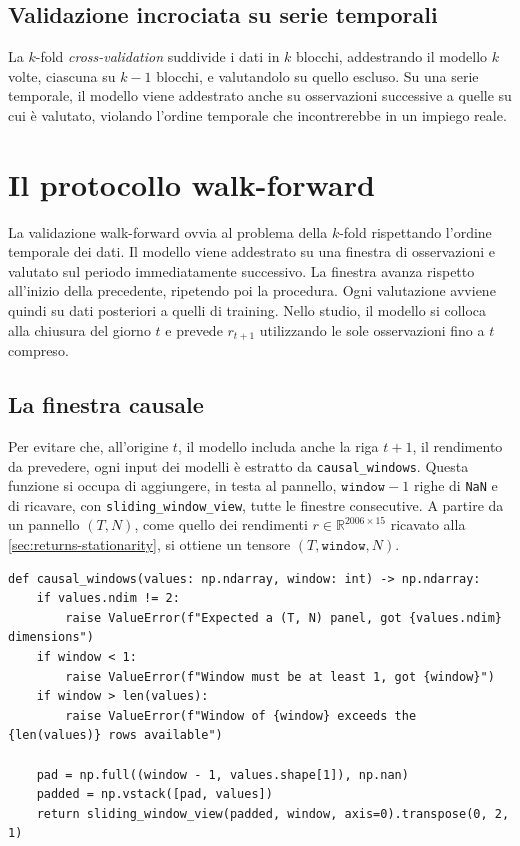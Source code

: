 \subsection{Validazione incrociata su serie temporali}

La $k$-fold \emph{cross-validation} suddivide i dati in $k$ blocchi, addestrando il modello $k$ volte, ciascuna su $k-1$ blocchi, e valutandolo su quello escluso. Su una serie temporale, il modello viene addestrato anche su osservazioni successive a quelle su cui è valutato, violando l'ordine temporale che incontrerebbe in un impiego reale.

\section{Il protocollo walk-forward}
\label{sec:tc-walkforward}

La validazione walk-forward ovvia al problema della $k$-fold rispettando l'ordine temporale dei dati. Il modello viene addestrato su una finestra di osservazioni e valutato sul periodo immediatamente successivo. La finestra avanza rispetto all'inizio della precedente, ripetendo poi la procedura. Ogni valutazione avviene quindi su dati posteriori a quelli di training. Nello studio, il modello si colloca alla chiusura del giorno $t$ e prevede $r_{t+1}$ utilizzando le sole osservazioni fino a $t$ compreso.

\subsection{La finestra causale}

Per evitare che, all'origine $t$, il modello includa anche la riga $t+1$, il rendimento da prevedere, ogni input dei modelli è estratto da \texttt{causal\_windows}. Questa funzione si occupa di aggiungere, in testa al pannello, $\texttt{window}-1$ righe di \texttt{NaN} e di ricavare, con \texttt{sliding\_window\_view}, tutte le finestre consecutive. A partire da un pannello $(T, N)$, come quello dei rendimenti $r\in\mathbb{R}^{2006\times 15}$ ricavato alla \cref{sec:returns-stationarity}, si ottiene un tensore $(T, \texttt{window}, N)$.

\begin{listing}[H]
\begin{verbatim}
def causal_windows(values: np.ndarray, window: int) -> np.ndarray:
    if values.ndim != 2:
        raise ValueError(f"Expected a (T, N) panel, got {values.ndim} dimensions")
    if window < 1:
        raise ValueError(f"Window must be at least 1, got {window}")
    if window > len(values):
        raise ValueError(f"Window of {window} exceeds the {len(values)} rows available")

    pad = np.full((window - 1, values.shape[1]), np.nan)
    padded = np.vstack([pad, values])
    return sliding_window_view(padded, window, axis=0).transpose(0, 2, 1)
\end{verbatim}
\caption{\texttt{causal\_windows}}
\label{lst:causal-windows}
\end{listing}

